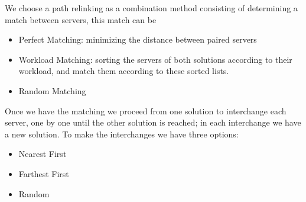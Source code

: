 We choose a path relinking as a combination method
consisting of
determining a match between servers,
this match can be
\begin{itemize}
\item Perfect Matching:
  minimizing the distance between paired servers
\item Workload Matching:
  sorting the servers of both solutions
  according to their workload,
  and match them according to these sorted lists.
\item Random Matching
\end{itemize}
Once we have the matching
we proceed from one solution
to interchange each server,
one by one
until the other solution is reached;
in each interchange
we have a new solution.
To make the interchanges
we have three options:
\begin{itemize}
\item Nearest First
\item Farthest First
\item Random
\end{itemize}


